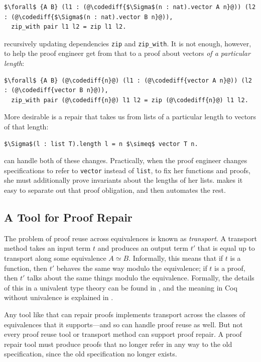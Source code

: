 \begin{lstlisting}
$\forall$ {A B} (l1 : (@\codediff{$\Sigma$(n : nat).vector A n}@)) (l2 : (@\codediff{$\Sigma$(n : nat).vector B n}@)),
  zip_with pair l1 l2 = zip l1 l2.
\end{lstlisting}
recursively updating dependencies \lstinline{zip} and \lstinline{zip_with}.
It is not enough, however, to help the proof engineer get from that to a proof about vectors \textit{of a particular length}:

\begin{lstlisting}
$\forall$ {A B} (@\codediff{n}@) (l1 : (@\codediff{vector A n}@)) (l2 : (@\codediff{vector B n}@)),
  zip_with pair (@\codediff{n}@) l1 l2 = zip (@\codediff{n}@) l1 l2.
\end{lstlisting}

More desirable is a repair that takes us from lists of a particular length to vectors of that length:

\begin{lstlisting}
$\Sigma$(l : list T).length l = n $\simeq$ vector T n.
\end{lstlisting}
\toolname can handle both of these changes.
Practically, when the proof engineer changes specifications to refer to \lstinline{vector} instead of \lstinline{list},
to fix her functions and proofs, she must additionally prove invariants about the lengths of her lists.
\toolname makes it easy to separate out that proof obligation, and then automates the rest.

\subsection{A Tool for Proof Repair}
\label{sec:time}

The problem of proof reuse across equivalences is known as \textit{transport}.
A transport method takes an input term $t$ and produces an output term $t'$ that is equal up to transport
along some equivalence $A \simeq B$. Informally, this means that if $t$ is a function, then $t'$ behaves the same way modulo the equivalence;
if $t$ is a proof, then $t'$ talks about the same things modulo the equivalence.
Formally, the details of this in a univalent type theory can be found in \citet{univalent2013homotopy}, and the meaning in Coq
without univalence is explained in \citet{tabareau2017equivalences}.

Any tool like \toolname that can repair proofs implements transport across the classes
of equivalences that it supports---and so can handle proof reuse as well.
But not every proof reuse tool or transport method can support proof repair.
A proof repair tool must produce proofs
that no longer refer in any way to the old specification, since the old specification no longer exists.

